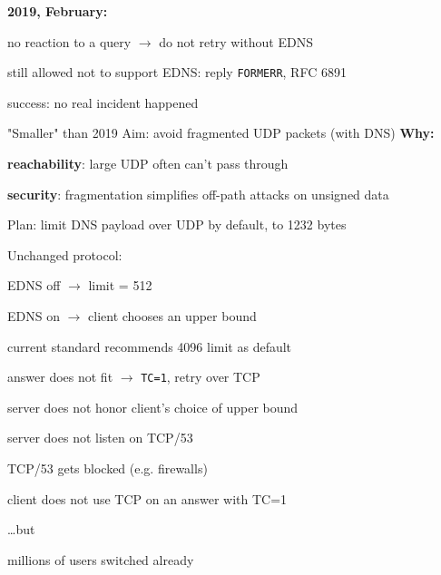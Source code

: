 {\newLine{}
\smallskip

{\bf 2019, February:\hfill\rm{}}
\bulletList
\item no reaction to a query $\to$ do not retry without EDNS
\item still allowed not to support EDNS: reply {\tt FORMERR}, RFC 6891
\medskip
\item success: no real incident happened
\endBulletList


\slide[2020: IP fragmentation]
"Smaller" than 2019
\medskip
Aim: avoid fragmented UDP packets (with DNS)
\medskip
{\bf Why:}
\bulletList
\item{\bf reachability}: large UDP often can't pass through
	\newLine{}
\item{\bf security}: fragmentation simplifies off-path attacks on unsigned data
\endBulletList


\slide[Plan]
Plan: limit DNS payload over UDP by default, to 1232 bytes \newLine

Unchanged protocol:
\bulletList
\item EDNS off $\to$ limit = 512
\item EDNS on  $\to$ client chooses an upper bound 
\item current standard recommends 4096 limit as default
\item answer does not fit $\to$ {\tt TC=1}, retry over TCP
\endBulletList


\bulletList
\item server does not honor client's choice of upper bound
\item server does not listen on TCP/53 
\item TCP/53 gets blocked (e.g. firewalls)
\item client does not use TCP on an answer with TC=1
\item {}
\endBulletList

\medskip\dots but
\bulletList
\item millions of users switched already 
\endBulletList


}
